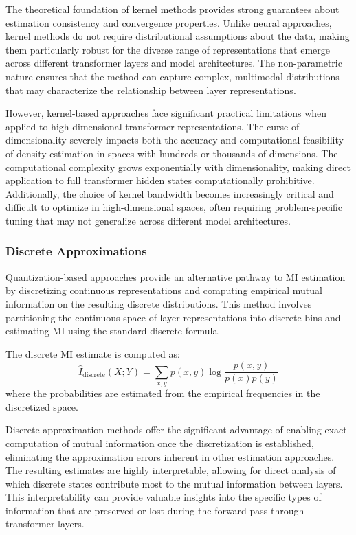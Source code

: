 The theoretical foundation of kernel methods provides strong guarantees about estimation consistency and convergence properties. Unlike neural approaches, kernel methods do not require distributional assumptions about the data, making them particularly robust for the diverse range of representations that emerge across different transformer layers and model architectures. The non-parametric nature ensures that the method can capture complex, multimodal distributions that may characterize the relationship between layer representations.

However, kernel-based approaches face significant practical limitations when applied to high-dimensional transformer representations. The curse of dimensionality severely impacts both the accuracy and computational feasibility of density estimation in spaces with hundreds or thousands of dimensions. The computational complexity grows exponentially with dimensionality, making direct application to full transformer hidden states computationally prohibitive. Additionally, the choice of kernel bandwidth becomes increasingly critical and difficult to optimize in high-dimensional spaces, often requiring problem-specific tuning that may not generalize across different model architectures.

\subsubsection{Discrete Approximations}

Quantization-based approaches provide an alternative pathway to MI estimation by discretizing continuous representations and computing empirical mutual information on the resulting discrete distributions. This method involves partitioning the continuous space of layer representations into discrete bins and estimating MI using the standard discrete formula.

The discrete MI estimate is computed as:
\[
\hat{I}_{\text{discrete}}(X;Y) = \sum_{x,y} p(x,y) \log\frac{p(x,y)}{p(x)p(y)}
\]
where the probabilities are estimated from the empirical frequencies in the discretized space.

Discrete approximation methods offer the significant advantage of enabling exact computation of mutual information once the discretization is established, eliminating the approximation errors inherent in other estimation approaches. The resulting estimates are highly interpretable, allowing for direct analysis of which discrete states contribute most to the mutual information between layers. This interpretability can provide valuable insights into the specific types of information that are preserved or lost during the forward pass through transformer layers.


